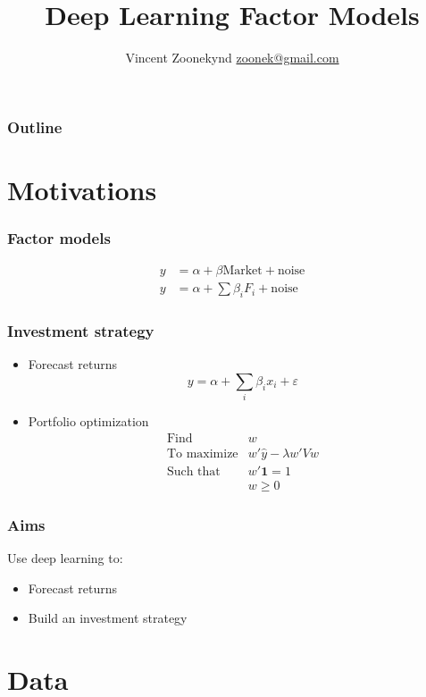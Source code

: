 \documentclass[a4paper,12pt,compress,serif]{beamer}
\title{Deep Learning Factor Models}
\author{Vincent Zoonekynd \href{mailto:zoonek@gmail.com}{zoonek@gmail.com}}
\let\geq\geqslant
\let\epsilon\varepsilon
\begin{document}

\begin{frame}
  \titlepage
\end{frame}

\begin{frame}
  \frametitle{Outline}
  \tableofcontents
\end{frame}

\section{Motivations}
\begin{frame}
  \frametitle{Factor models}
  \begin{align*}
    y &= \alpha + \beta \text{Market} + \text{noise} \\[1cm]
    y &= \alpha + \sum \beta_i F_i + \text{noise}
  \end{align*}
\end{frame}

\begin{frame}
  \frametitle{Investment strategy}
  \begin{itemize}
  \item Forecast returns
    \[ y = \alpha + \sum_i \beta_i x_i + \epsilon \]
  \item Portfolio optimization
    \[
    \begin{array}{ll}
      \text{Find} & w \\
      \text{To maximize} & w' \hat y - \lambda w' V w \\
      \text{Such that} & w' \mathbf 1 = 1 \\
      & w \geq 0 
    \end{array}
    \]
  \end{itemize}
\end{frame}

\begin{frame}
  \frametitle{Aims}
  Use deep learning to:
  \begin{itemize}
  \item Forecast returns 
  \item Build an investment strategy
  \end{itemize}
\end{frame}

\section{Data}
\end{document}

